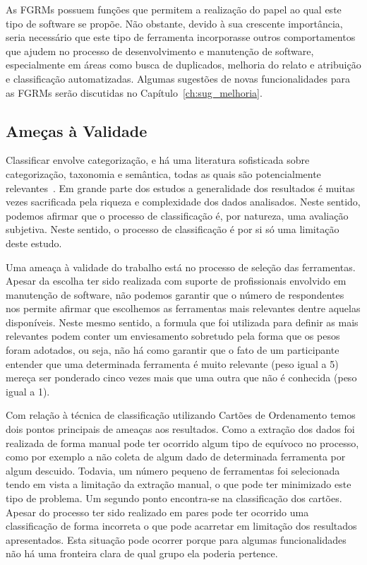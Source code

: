 As FGRMs possuem funções que permitem a realização do papel ao qual este tipo de
software se propõe. Não obstante, devido à sua crescente importância, seria
necessário que este tipo de ferramenta incorporasse outros comportamentos que
ajudem no processo de desenvolvimento e manutenção de software, especialmente em
áreas como busca de duplicados, melhoria do relato e atribuição e classificação
automatizadas. Algumas sugestões de novas funcionalidades para as FGRMs serão
discutidas no Capítulo~\ref{ch:sug_melhoria}.

\subsection{Ameças à Validade}
\label{sec:ameacas_a_validade}

Classificar envolve categorização, e há uma literatura sofisticada sobre
categorização, taxonomia e semântica, todas as quais são potencialmente
relevantes~\cite{rugg2005sorting}. Em grande parte dos estudos a generalidade
dos resultados é muitas vezes sacrificada pela riqueza e complexidade dos dados
analisados. Neste sentido, podemos afirmar que o processo de classificação é,
por natureza, uma avaliação subjetiva. Neste sentido, o processo de
classificação é por si só uma limitação deste estudo.

Uma ameaça à validade do trabalho está no processo de seleção das ferramentas.
Apesar da escolha ter sido realizada com suporte de profissionais envolvido em
manutenção de software, não podemos garantir que o número de respondentes nos
permite afirmar que escolhemos as ferramentas mais relevantes dentre aquelas
disponíveis. Neste mesmo sentido, a formula que foi utilizada para definir as
mais relevantes podem conter um enviesamento sobretudo pela forma que os pesos
foram adotados, ou seja, não há como garantir que o fato de um participante
entender que uma determinada ferramenta é muito relevante (peso igual a 5)
mereça ser ponderado cinco vezes mais que uma outra que não é conhecida (peso
igual a 1).

Com relação à técnica de classificação utilizando Cartões de Ordenamento temos
dois pontos principais de ameaças aos resultados. Como a extração dos dados foi
realizada de forma manual pode ter ocorrido algum tipo de equívoco no processo,
como por exemplo a não coleta de algum dado de determinada ferramenta por algum
descuido. Todavia, um número pequeno de ferramentas foi selecionada tendo em
vista a limitação da extração manual, o que pode ter minimizado este tipo de
problema. Um segundo ponto encontra-se na classificação dos cartões. Apesar do
processo ter sido realizado em pares pode ter ocorrido uma classificação de
forma incorreta o que pode acarretar em limitação dos resultados apresentados.
Esta situação pode ocorrer porque para algumas funcionalidades não há uma
fronteira clara de qual grupo ela poderia pertence.

